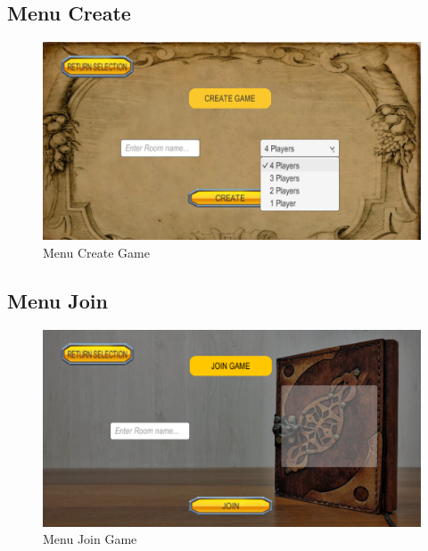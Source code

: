 \documentclass[a4paper, 11pt]{article}
\begin{document}
	\subsection{Menu Create}
	\begin{figure}[!ht]
		\centering
		\includegraphics[scale=0.3]{images/create.png}
		\caption{Menu Create Game}
	\end{figure}
	
	\subsection{Menu Join}
	\begin{figure}[!ht]
		\centering
		\includegraphics[scale=0.3]{images/join.png}
		\caption{Menu Join Game}
	\end{figure}
	
	\clearpage
	
\end{document}
